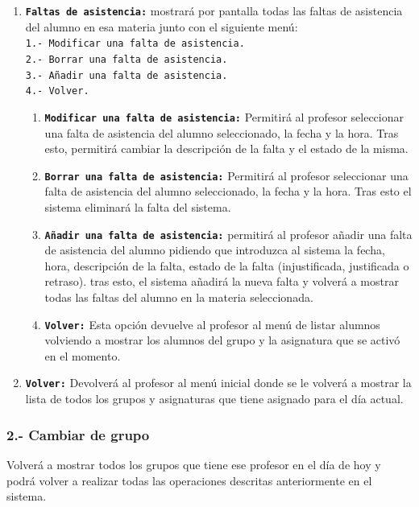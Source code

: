 \documentclass{book}
\begin{document}
{\begin{enumerate}
\begin{enumerate}
		\item \textbf{\texttt{Volver:}} Esta opción devuelve al profesor al menú de listar alumnos volviendo a mostrar los alumnos del grupo y asignatura que se activó en el momento.
	\end{enumerate}
	\item \textbf{\texttt{Faltas de asistencia:}} mostrará por pantalla todas las faltas de asistencia del alumno en esa materia junto con el siguiente menú:\\
	\texttt{1.- Modificar una falta de asistencia.}\\
	\texttt{2.- Borrar una falta de asistencia.}\\
	\texttt{3.- Añadir una falta de asistencia.}\\
	\texttt{4.- Volver.}
	\begin{enumerate}
		\item \textbf{\texttt{Modificar una falta de asistencia:}} Permitirá al profesor seleccionar una falta de asistencia del alumno seleccionado, la fecha y la hora. Tras esto, permitirá cambiar la descripción de la falta y el estado de la misma.
		\item \textbf{\texttt{Borrar una falta de asistencia:}} Permitirá al profesor seleccionar una falta de asistencia del alumno seleccionado, la fecha y la hora. Tras esto el sistema eliminará la falta del sistema.
		\item \textbf{\texttt{Añadir una falta de asistencia:}} permitirá al profesor añadir una falta de asistencia del alumno pidiendo que introduzca al sistema la fecha, hora, descripción de la falta, estado de la falta (injustificada, justificada o retraso). tras esto, el sistema añadirá la nueva falta y volverá a mostrar todas las faltas del alumno en la materia seleccionada.
		\item \textbf{\texttt{Volver:}} Esta opción devuelve al profesor al menú de listar alumnos volviendo a mostrar los alumnos del grupo y la asignatura que se activó en el momento.
	\end{enumerate}
	\item \textbf{\texttt{Volver:}} Devolverá al profesor al menú inicial donde se le volverá a mostrar la lista de todos los grupos y asignaturas que tiene asignado para el día actual.
\end{enumerate}
}
\subsubsection{2.- Cambiar de grupo}{
Volverá a mostrar todos los grupos que tiene ese profesor en el día de hoy y podrá volver a realizar todas las operaciones descritas anteriormente en el sistema.
}
\end{document}
